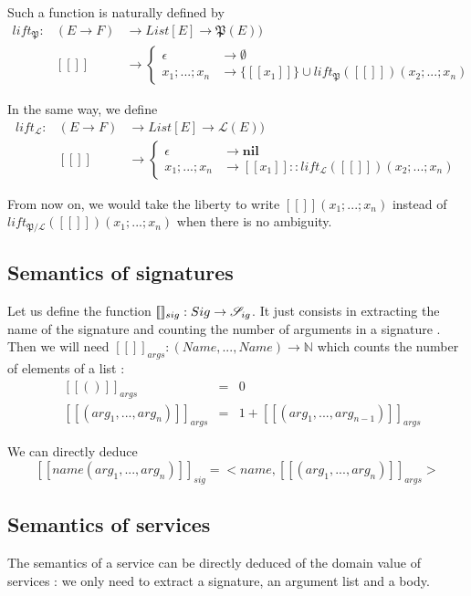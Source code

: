 Such a function is naturally defined by
\[\begin{array}{lll}
lift_\mathfrak{P} :&(E\rightarrow F) &\rightarrow List[E] \rightarrow \mathfrak{P}(E))\\
&[\![]\!] &\rightarrow \begin{cases}
\epsilon &\rightarrow \emptyset \\
x_1; ... ; x_n &\rightarrow \{[\![x_1]\!]\}\cup lift_\mathfrak{P}([\![]\!])(x_2;...;x_n)
\end{cases}
\end{array}
\]

In the same way, we define
\[\begin{array}{lll}
lift_\mathcal{L} :&(E\rightarrow F) &\rightarrow List[E] \rightarrow \mathcal{L}(E))\\
&[\![]\!] &\rightarrow \begin{cases}
\epsilon &\rightarrow \mathbf{nil} \\
x_1; ... ; x_n &\rightarrow [\![x_1]\!] :: lift_\mathcal{L}([\![]\!])(x_2;...;x_n)
\end{cases}
\end{array}
\]
\vspace{0.5cm}

From now on, we would take the liberty to write  $[\![]\!](x_1;...;x_n)$ instead of \newline $lift_{\mathfrak{P}/\mathcal{L}}([\![]\!])(x_1; ... ; x_n)$ when there is no ambiguity.


\subsection{Semantics of signatures}
Let us define the function $[\![]\!]_{sig} :  Sig \rightarrow \mathcal{S}_{ig} $. It just consists in extracting the name of the signature and counting the number of arguments in a signature . Then we will need $[\![]\!]_{args} : (Name, ... , Name) \rightarrow \mathbb{N}$  which counts the number of elements of a list : 
\[\begin{array}{llll}
&[\![()]\!]_{args} &=& 0\\
&[\![(arg_1,...,arg_n)]\!]_{args} &=& 1 + [\![(arg_1,...,arg_{n-1})]\!]_{args} 
\end{array}\]

We can directly deduce
\[[\![name(arg_1,...,arg_n)]\!]_{sig} = <name, [\![(arg_1,...,arg_n)]\!]_{args}> \]

\subsection{Semantics of services}
The semantics of a service can be directly deduced of the domain value of services : we only need to extract a signature, an argument list and a body.

